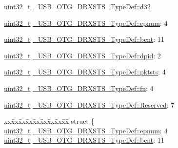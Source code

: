 \begin{DoxyCompactItemize}
\begin{tabbing}
\end{tabbing}\item 
\hyperlink{stdint_8h_a435d1572bf3f880d55459d9805097f62}{uint32\-\_\-t} \hyperlink{group___u_s_b___o_t_g___d_r_i_v_e_r_gaea4bd787e51cf95a95ed7f5b8683b2f9}{\-\_\-\-U\-S\-B\-\_\-\-O\-T\-G\-\_\-\-D\-R\-X\-S\-T\-S\-\_\-\-Type\-Def\-::d32}
\item 
\hyperlink{stdint_8h_a435d1572bf3f880d55459d9805097f62}{uint32\-\_\-t} \hyperlink{group___u_s_b___o_t_g___d_r_i_v_e_r_ga2f07aa5421872ec08403ee007de2a243}{\-\_\-\-U\-S\-B\-\_\-\-O\-T\-G\-\_\-\-D\-R\-X\-S\-T\-S\-\_\-\-Type\-Def\-::epnum}\-: 4
\item 
\hyperlink{stdint_8h_a435d1572bf3f880d55459d9805097f62}{uint32\-\_\-t} \hyperlink{group___u_s_b___o_t_g___d_r_i_v_e_r_ga5d9116a3a8b6fbe994ca0fef4ea1fc07}{\-\_\-\-U\-S\-B\-\_\-\-O\-T\-G\-\_\-\-D\-R\-X\-S\-T\-S\-\_\-\-Type\-Def\-::bcnt}\-: 11
\item 
\hyperlink{stdint_8h_a435d1572bf3f880d55459d9805097f62}{uint32\-\_\-t} \hyperlink{group___u_s_b___o_t_g___d_r_i_v_e_r_gab6a62e50cc115337d81dd3a86bc9ce56}{\-\_\-\-U\-S\-B\-\_\-\-O\-T\-G\-\_\-\-D\-R\-X\-S\-T\-S\-\_\-\-Type\-Def\-::dpid}\-: 2
\item 
\hyperlink{stdint_8h_a435d1572bf3f880d55459d9805097f62}{uint32\-\_\-t} \hyperlink{group___u_s_b___o_t_g___d_r_i_v_e_r_gaa545e32b80f0074a447ba35d16914bee}{\-\_\-\-U\-S\-B\-\_\-\-O\-T\-G\-\_\-\-D\-R\-X\-S\-T\-S\-\_\-\-Type\-Def\-::pktsts}\-: 4
\item 
\hyperlink{stdint_8h_a435d1572bf3f880d55459d9805097f62}{uint32\-\_\-t} \hyperlink{group___u_s_b___o_t_g___d_r_i_v_e_r_gaa2fb877c0502a6b53de02b06aacafaa8}{\-\_\-\-U\-S\-B\-\_\-\-O\-T\-G\-\_\-\-D\-R\-X\-S\-T\-S\-\_\-\-Type\-Def\-::fn}\-: 4
\item 
\hyperlink{stdint_8h_a435d1572bf3f880d55459d9805097f62}{uint32\-\_\-t} \hyperlink{group___u_s_b___o_t_g___d_r_i_v_e_r_ga2822869911f2d6f53098a72f710dc2f6}{\-\_\-\-U\-S\-B\-\_\-\-O\-T\-G\-\_\-\-D\-R\-X\-S\-T\-S\-\_\-\-Type\-Def\-::\-Reserved}\-: 7
\item 
\begin{tabbing}
xx\=xx\=xx\=xx\=xx\=xx\=xx\=xx\=xx\=\kill
struct \{\\
\>\hyperlink{stdint_8h_a435d1572bf3f880d55459d9805097f62}{uint32\_t} \hyperlink{group___u_s_b___o_t_g___d_r_i_v_e_r_ga2f07aa5421872ec08403ee007de2a243}{\_USB\_OTG\_DRXSTS\_TypeDef::epnum}: 4\\
\>\hyperlink{stdint_8h_a435d1572bf3f880d55459d9805097f62}{uint32\_t} \hyperlink{group___u_s_b___o_t_g___d_r_i_v_e_r_ga5d9116a3a8b6fbe994ca0fef4ea1fc07}{\_USB\_OTG\_DRXSTS\_TypeDef::bcnt}: 11\\

\end{tabbing}
\end{DoxyCompactItemize}
